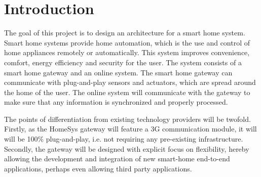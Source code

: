 \section{Introduction}\label{sec:introduction}
The goal of this project is to design an architecture for a smart home system.
Smart home systems provide home automation, which is the use and control of home appliances remotely or automatically. 
This system improves convenience, comfort, energy efficiency and security for the user.
The system consists of a smart home gateway and an online system.
The smart home gateway can communicate with plug-and-play sensors and actuators, which are spread around the home of the user.
The online system will communicate with the gateway to make sure that any information is synchronized and properly processed.

The points of differentiation from existing technology providers will be twofold. Firstly, as the HomeSys gateway will feature a 3G communication module, it will will be 100\% plug-and-play, i.e. not requiring any pre-existing infrastructure. Secondly, the gateway will be designed with explicit focus on flexibility, hereby allowing the development and integration of new smart-home end-to-end applications, perhaps even allowing third party applications.